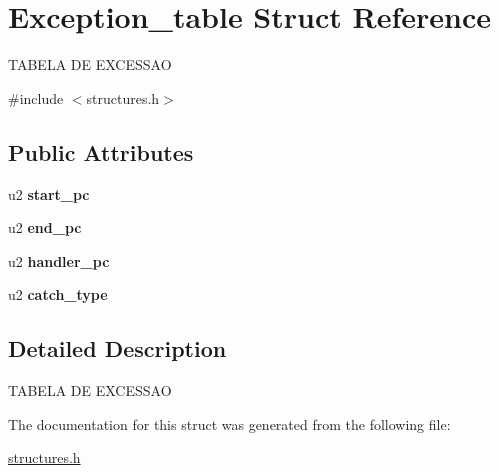 \hypertarget{structException__table}{}\section{Exception\+\_\+table Struct Reference}
\label{structException__table}




 T\+A\+B\+E\+LA DE E\+X\+C\+E\+S\+S\+AO  




{\ttfamily \#include $<$structures.\+h$>$}

\subsection*{Public Attributes}
\begin{DoxyCompactItemize}
\item 
\mbox{\label{structException__table_aa354ef70082e0dbaa452b1533c7a2a5b}} 
u2 {\bfseries start\+\_\+pc}
\item 
\mbox{\label{structException__table_ab9edee91cced1c7d7995554501d1b577}} 
u2 {\bfseries end\+\_\+pc}
\item 
\mbox{\label{structException__table_a4a97f9813caa72811f9309e328917c05}} 
u2 {\bfseries handler\+\_\+pc}
\item 
\mbox{\label{structException__table_a197db0bb2e94b17bcbd7d505e29a2956}} 
u2 {\bfseries catch\+\_\+type}
\end{DoxyCompactItemize}


\subsection{Detailed Description}


 T\+A\+B\+E\+LA DE E\+X\+C\+E\+S\+S\+AO 

The documentation for this struct was generated from the following file\+:\begin{DoxyCompactItemize}
\item 
\mbox{\hyperlink{structures_8h}{structures.\+h}}\end{DoxyCompactItemize}
